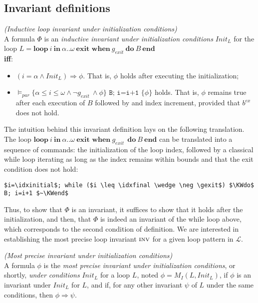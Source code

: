 \documentclass[a4paper,10pt]{article}
\newcommand{\prog}{\ensuremath{\mathcal{L}}\xspace}
\newcommand{\idx}{\ensuremath{i}\xspace}
\newcommand{\idxinitial}{\ensuremath{\alpha}\xspace}
\newcommand{\idxfinal}{\ensuremath{\omega}\xspace}
\newcommand{\KWloop}{\ensuremath{\mathrm{\textbf{loop}}~}}
\newcommand{\KWdo}{\ensuremath{\mathrm{\textbf{do}}~}}
\newcommand{\KWend}{\ensuremath{\mathrm{\textbf{end}}}}
\newcommand{\KWin}{\ensuremath{~\mathrm{\textbf{in}}~}}
\newcommand{\KWexit}{\ensuremath{\mathrm{\textbf{exit when}}~}}
\newcommand{\gexit}{\ensuremath{\mathit{g_{exit}~}}}
\newcommand{\inv}{\ensuremath{\textsc{inv}}\xspace}
\newcommand{\initcond}[1]{\ensuremath{\mathit{Init_{#1}}}}
\newenvironment{definition}[1][Definition]{\begin{trivlist}
\item[\hskip \labelsep {\bfseries #1}]}{\end{trivlist}}
\begin{document}
\subsection{Invariant definitions}

\begin{definition} \emph {(Inductive loop invariant under initialization conditions)}\\
A formula $\Phi$ is an \textit{inductive invariant under initialization conditions} \initcond{L} for the loop 
\hspace{1cm} $L = \KWloop  \idx \KWin \idxinitial ..\idxfinal ~ \KWexit \gexit \KWdo B ~\KWend$ \\
\textbf{iff}: 
\begin{itemize}
\item $(\idx=\idxinitial \land \initcond{L}) \Rightarrow \phi$. 
      That is, $\phi$ holds after executing the initialization;
\item $\vDash_{par} \{\idxinitial \leq \idx \leq \idxfinal \wedge \neg \gexit \wedge\phi \} \texttt{ B; i=i+1 } \{ \phi \}$ holds. 
      That is, $\phi$ remains true after each execution of $B$ followed by and index increment, 
      provided that $b^{ex}$ does not hold.
\end{itemize}
\end{definition}

The intuition behind this invariant definition lays on the following translation.
The loop $\KWloop  \idx \KWin \idxinitial ..\idxfinal ~ \KWexit \gexit ~ \KWdo B ~\KWend$ 
can be translated into a sequence of commands: the initialization of the loop index, 
followed by a classical while loop iterating as long as the index remains within bounds
and that the exit condition does not hold:
{\small
\begin{lstlisting}[mathescape]
   $i=\idxinitial$; while ($i \leq \idxfinal \wedge \neg \gexit$) $\KWdo$ B; i=i+1 $~\KWend$
\end{lstlisting}
}
Thus, to show that $\Phi$ is an invariant, it suffices to show that it holds after 
the initialization, and then, that $\Phi$ is indeed an invariant of the while loop above, 
which corresponds to the second condition of definition.
We are interested in establishing  the most precise loop invariant \inv for a given loop pattern in \prog.

\begin{definition} \emph {(Most precise invariant under initialization conditions)}\\
A formula $\phi$ is the \textit{most precise invariant under initialization conditions}, 
or shortly, \textit{under conditions} \initcond{L} for a loop $L$, noted $\phi = M_I(L, \initcond{L})$, 
if $\phi$ is an invariant under \initcond{L} for $L$, and if, for any other invariant $\psi$ of $L$ 
under the same conditions, then $\phi \Rightarrow \psi$.
\end{definition}
\end{document}
